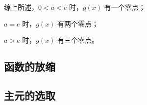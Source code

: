 \begin{jie}
    综上所述，$0 < a < e$ 时，$g(x)$ 有一个零点；
    
    $a = e$ 时，$g(x)$ 有两个零点；
    
    $a > e$ 时，$g(x)$ 有三个零点。
    
    
\end{jie}
    



\clearpage
\subsection{函数的放缩}
\clearpage
\subsection{主元的选取}
\clearpage

